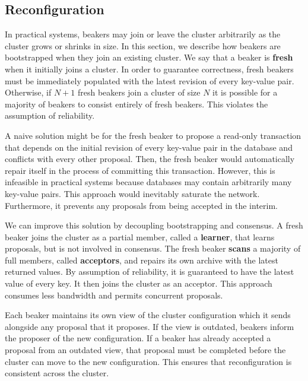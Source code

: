 \documentclass{article}
\begin{document}
    \subsection{Reconfiguration}
    In practical systems, beakers may join or leave the cluster arbitrarily as the cluster grows or
    shrinks in size. In this section, we describe how beakers are bootstrapped when they join an
    existing cluster. We say that a beaker is \textbf{fresh} when it initially joins a cluster. In
    order to guarantee correctness, fresh beakers must be immediately populated with the latest
    revision of every key-value pair. Otherwise, if $N + 1$ fresh beakers join a cluster of size $N$
    it is possible for a majority of beakers to consist entirely of fresh beakers. This violates the
    assumption of reliability.

    A naive solution might be for the fresh beaker to propose a read-only transaction that depends on
    the initial revision of every key-value pair in the database and conflicts with every other
    proposal. Then, the fresh beaker would automatically repair itself in the process of committing
    this transaction. However, this is infeasible in practical systems because databases may contain
    arbitrarily many key-value pairs. This approach would inevitably saturate the network.
    Furthermore, it prevents any proposals from being accepted in the interim.

    We can improve this solution by decoupling bootstrapping and consensus. A fresh beaker joins the
    cluster as a partial member, called a \textbf{learner}, that learns proposals, but is not involved
    in consensus. The fresh beaker \textbf{scans} a majority of full members, called
    \textbf{acceptors}, and repairs its own archive with the latest returned values. By assumption of
    reliability, it is guaranteed to have the latest value of every key. It then joins the cluster as
    an acceptor. This approach consumes less bandwidth and permits concurrent proposals.

    Each beaker maintains its own view of the cluster configuration which it sends alongside any
    proposal that it proposes. If the view is outdated, beakers inform the proposer of the new
    configuration. If a beaker has already accepted a proposal from an outdated view, that proposal
    must be completed before the cluster can move to the new configuration. This ensures that
    reconfiguration is consistent across the cluster.

\end{document}
